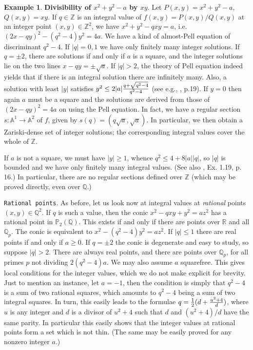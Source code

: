 \documentclass[leqno,12pt]{article} %
\def\A{{{\mathbb A}}}
\def\Z{{{\mathbb Z}}}
\def\Q{{{\mathbb Q}}}
\def\R{{{\mathbb R}}}
\def\P{{{\mathbb P}}}
\theoremstyle{plain} %
\theoremstyle{definition} %
\newtheorem{example}[theorem]{\indent\sc Example}
\begin{document}
\begin{example}\label{EX.1} {\bf Divisibility of $x^2+y^2-a$ by $xy$}.  Let $P(x,y)=x^2+y^2-a$, $Q(x,y)=xy$. If  $q\in\Z$ is an integral value of $f(x,y)=P(x,y)/Q(x,y)$ at an integer point $(x,y)\in\Z^2$,  we have $x^2+y^2-qxy=a$, i.e. $(2x-qy)^2-(q^2-4)y^2=4a$.  We have a kind of almost-Pell equation of discriminant $q^2-4$. If $|q|=0,1$ we have only finitely many integer solutions.  If $q=\pm 2$, there are solutions if and only if $a$ is a square, and the integer  solutions lie on the  two  lines $x-qy=\pm\sqrt a$. If $|q|>2$, the theory of Pell equation indeed yields that if there is an integral solution there are infinitely many. Also, a solution with least $|y|$ satisfies $y^2\le 2|a|{q+\sqrt{q^2-4}\over q^2-4}$ (see e.g., \cite{Z2}, p.19). If $y=0$ then again $a$ must be a square and the solutions are derived from those of $(2x-qy)^2=4a$ on using the Pell equation. In fact, we have a regular section $s:\A^1\to\A^2$ of $f$, given by $s(q)=(q\sqrt a, \sqrt a)$. In particular,  we then obtain a Zariski-dense set of integer solutions; the corresponding integral values cover the whole of $\Z$. 

If $a$ is not a square, we must have $|y|\ge 1$,  whence 
$q^2\le 4+8|a||q|$, so $|q|$ is bounded and we have only finitely many integral values.
(See also \cite{Z2}, Ex. 1.19, p. 16.)  In particular, there are no regular sections  defined over $\Z$  (which may be proved directly, even over $\Q$.) 
\end{example}

\medskip

{\tt Rational points}. As before, let us look now at integral values at {\it rational} points $(x,y)\in\Q^2$. If $q$ is such a value, then the conic $x^2-qxy+y^2=az^2$ has a rational point in $\P_2(\Q)$. This exists if and only if there are points over $\R$ and all $\Q_p$. The conic is equivalent to $x^2-(q^2-4)y^2=az^2$. If $|q|\le 1$ there are real points if and only if $a\ge 0$. If $q=\pm 2$ the conic is degenerate and easy to study, so suppose $|q|>2$. There are always real points, and there are points over $\Q_p$, for all primes $p$ not dividing $2(q^2-4)a$. We may also assume $a$ squarefree.  This gives local conditions for the integer values, which we do not make explicit for brevity. Just to mention an instance, let $a=-1$, then the condition is simply that $q^2-4$ is a sum of two rational squares, which amounts to $q^2-4$ being a sum of two integral squares. In turn, this easily leads to the formulae $q={1\over 2}(d+{u^2+4\over d})$, where $u$ is any integer and $d$ is a divisor of $u^2+4$ such that $d$ and $(u^2+4)/d$ have the same parity.  In particular this easily shows that the integer values at rational points form a set which is not thin. (The same may be easily proved for any nonzero integer $a$.)
\end{document}
